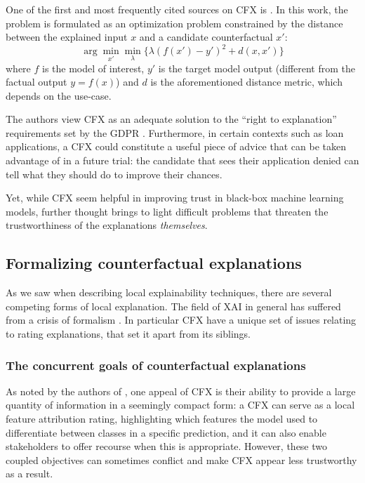 \documentclass[../main.tex]{subfiles}
\begin{document}
One of the first and most frequently cited sources on CFX is \citeauthor{wachterCounterfactual2017} \cite{wachterCounterfactual2017}. In this work, the problem is formulated as an optimization problem constrained by the distance between the explained input $x$ and a candidate counterfactual $x'$:
\begin{equation}
    \arg\min_{x'} \min_\lambda \{ \lambda (f(x') - y')^2 + d(x, x') \}
\end{equation}
where $f$ is the model of interest, $y'$ is the target model output
(different from the factual output $y = f(x)$) and $d$ is the aforementioned
distance metric, which depends on the use-case.

The authors view CFX as an adequate solution to the ``right to explanation'' requirements set by the GDPR \cite{kaminskiRight2018}.
Furthermore, in certain contexts such as loan applications, a CFX could constitute a useful piece of advice that can be taken advantage of in a future trial: the candidate that sees their application denied can tell what they should do to improve their chances.

Yet, while CFX seem helpful in improving trust in black-box machine learning models, further thought brings to light difficult problems that threaten the trustworthiness of the explanations \emph{themselves}.

\subsection{Formalizing counterfactual explanations}

As we saw when describing local explainability techniques, there are several competing forms of local explanation.
The field of XAI in general has suffered from a crisis of formalism \cite{liptonMythos2017, leavittFalsifiable2020}.
In particular CFX have a unique set of issues relating to rating explanations, that set it apart from its siblings.

\subsubsection{The concurrent goals of counterfactual explanations}

As noted by the authors of \cite{wachterCounterfactual2017}, one appeal of CFX is their ability to provide a large quantity of information in a seemingly compact form: a CFX can serve as a local feature attribution rating, highlighting which features the model used to differentiate between classes in a specific prediction, and it can also enable stakeholders to offer recourse when this is appropriate.
However, these two coupled objectives can sometimes conflict and make CFX appear less trustworthy as a result.
\end{document}
